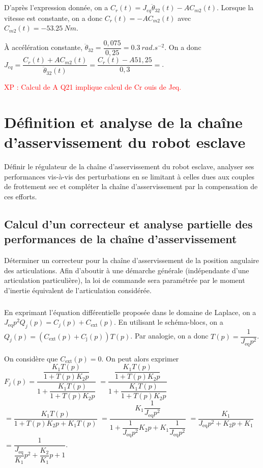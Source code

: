\documentclass[10pt,fleqn]{article} %
\begin{document}
\subparagraph{}%
D'après l'expression donnée, on a $C_r(t)=J_{eq}\ddot{\theta}_{32}(t)-A C_{m2}(t)$.
Lorsque la vitesse est constante, on a donc $C_r(t)=-A C_{m2}(t)$ avec $C_{m2}(t)=-\SI{53,25}{Nm}$.


À accélération constante, $\ddot{\theta}_{32} = \dfrac{0,075}{0,25}=\SI{0,3}{rad.s^{-2}}$. On a donc 
$J_{eq}=\dfrac{C_r(t)+A C_{m2}(t)}{\ddot{\theta}_{32}(t)}=\dfrac{C_r(t)-A 51,25}{0,3}=$.

\textcolor{red}{XP : Calcul de A Q21  implique calcul de Cr ouis de Jeq.}
\subparagraph{}%

\section{Définition et analyse de la chaîne d’asservissement du robot esclave}
\begin{obj}
Définir le régulateur de la chaîne d’asservissement du robot esclave, analyser ses performances vis-à-vis
des perturbations en se limitant à celles dues aux couples de frottement sec et compléter la chaîne
d’asservissement par la compensation de ces efforts.
\end{obj}

\subsection{Calcul d’un correcteur et analyse partielle des performances de la chaîne d’asservissement}
\begin{obj}
Déterminer un correcteur pour la chaîne d’asservissement de la position angulaire des articulations.
Afin d’aboutir à une démarche générale (indépendante d’une articulation particulière), la loi de commande
sera paramétrée par le moment d’inertie équivalent de l’articulation considérée.
\end{obj}

\subparagraph{}%
En exprimant l'équation différentielle proposée dans le domaine de Laplace, on a 
$J_{\text{eq}} p^2{Q}_j(p)=C_j(p)+C_{\text{ext}}(p)$.
En utilisant le schéma-blocs, on a $Q_j(p)=\left(C_{\text{ext}}(p)+C_{\text{j}}(p)\right)T(p)$. 
Par analogie, on a donc $T(p)=\dfrac{1}{J_{\text{eq}}p^2}$.

On considère que $C_{\text{ext}}(p)=0$.  On peut alors exprimer 
$F_j(p)= \dfrac{\dfrac{K_1T(p)}{1+T(p)K_2 p} }{1+\dfrac{K_1T(p)}{1+T(p)K_2 p}}$
$= \dfrac{\dfrac{K_1T(p)}{1+T(p)K_2 p} }{1+\dfrac{K_1T(p)}{1+T(p)K_2 p}}$
$= \dfrac{K_1T(p) }{1+T(p)K_2 p+K_1T(p)}$
$= \dfrac{K_1\dfrac{1}{J_{\text{eq}}p^2}}{1+\dfrac{1}{J_{\text{eq}}p^2}K_2 p+K_1\dfrac{1}{J_{\text{eq}}p^2}}$
$= \dfrac{K_1}{J_{\text{eq}}p^2+K_2 p+K_1}$
$= \dfrac{1}{\dfrac{J_{\text{eq}}}{K_1}p^2+\dfrac{K_2}{K_1}p+1}$.
\end{document}
